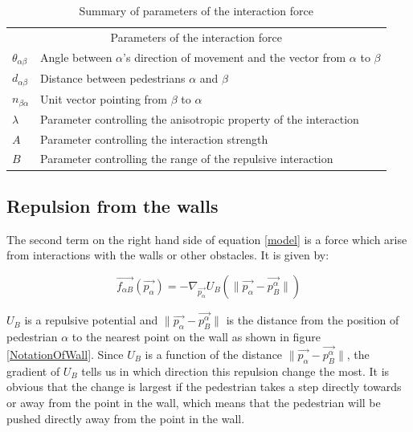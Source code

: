 \begin{table}
    \centering
    \begin{tabular}{l l}
        \toprule
        \multicolumn{2}{c}{\textsf{Parameters of the interaction force}}\\
        $\theta_{\alpha \beta}$ & Angle between $\alpha$'s direction of 
        movement and the vector from $\alpha$ to $\beta$\\
        $d_{\alpha \beta}$& Distance between pedestrians $\alpha$ and $\beta$ \\
        $n_{\beta \alpha}$& Unit vector pointing from $\beta$ to $\alpha$ \\
        $\lambda$& Parameter controlling the anisotropic property of the 
        interaction\\
        $A$& Parameter controlling the interaction strength \\
        $B$& Parameter controlling the range of the repulsive interaction  \\
        \bottomrule
    \end{tabular}
    \caption{Summary of parameters of the interaction force}
    \label{tbl:interaction-forces}
\end{table}

\subsection{Repulsion from the walls}\label{seq:repulsion-walls}
The second term on the right hand side of equation \eqref{model} is a force which 
arise from interactions with the walls or other obstacles. It is given by:

\begin{equation}\label{wallpotential}
    \overrightarrow{f_{\alpha B}} \left( \overrightarrow{p_{\alpha}} \right) =
    - \nabla_{\overrightarrow{p_{\alpha}}} U_{B}
    \left( \| \overrightarrow{p_{\alpha}} - \overrightarrow{p_{B}^{\alpha}} \| \right)
\end{equation}

$U_B$ is a repulsive potential and $\|\overrightarrow{p_{\alpha}} - \overrightarrow{p_{B}^{\alpha}}\|$ 
is the distance from the position of pedestrian $\alpha$ to the nearest point on the 
wall as shown in figure \ref{NotationOfWall}. Since $U_B$ is a function of the distance 
$\| \overrightarrow{p_{\alpha}} - \overrightarrow{p_{B}^{\alpha}} \|$, the gradient of $U_B$ tells us in 
which direction this repulsion change the most. It is obvious that the change is 
largest if the pedestrian takes a step directly towards or away from the point in the wall, 
which means that the pedestrian will be pushed directly away from the point in the wall.

